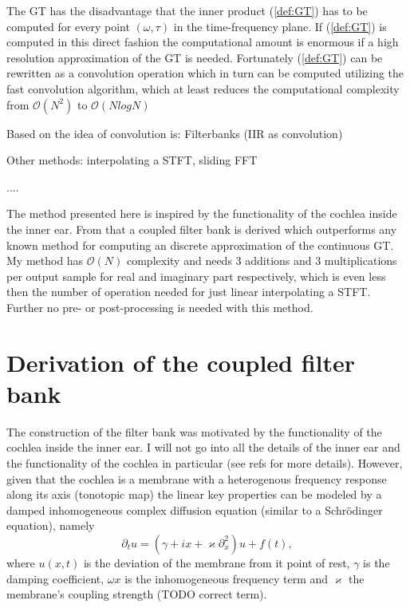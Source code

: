 \documentclass[journal]{IEEEtran}
\newcommand	{\be}	{\begin{equation}}
\newcommand	{\ee}	{\end{equation}}
\begin{document}
The GT has the disadvantage that the inner product (\ref{def:GT}) has to be computed for every
point $(\omega,\tau)$ in the time-frequency plane.
If (\ref{def:GT}) is computed in this direct fashion the computational amount is enormous
if a high resolution approximation of the GT is needed.
Fortunately (\ref{def:GT}) can be rewritten as a convolution operation which in turn can be
computed utilizing the fast convolution algorithm, which at least reduces the computational
complexity from ${\mathcal O}(N^2)$ to ${\mathcal O}(N log N )$

Based on the idea of convolution is: Filterbanks (IIR as convolution) \cite{Unser1994}

Other methods: interpolating a STFT, sliding FFT

....

The method presented here is inspired by the functionality of the cochlea inside the inner ear.
From that a coupled filter bank is derived which outperforms any known method for computing
an discrete approximation of the continuous GT. My method has ${\mathcal O}(N)$ complexity
and needs 3 additions and 3 multiplications per output sample for real and imaginary part respectively,
which is even less then the number of operation needed for just linear interpolating a STFT.
Further no pre- or post-processing is needed with this method.






  \section{Derivation of the coupled filter bank}
  \label{sec:construction}

The construction of the filter bank was motivated by the functionality of the cochlea inside the inner ear.
I will not go into all the details of the inner ear and the functionality of the cochlea in particular (see
refs for more details). However, given that the cochlea is a membrane with a heterogenous frequency response
along its axis (tonotopic map) the linear key properties can be modeled by a damped inhomogeneous complex diffusion equation (similar to a Schr\"odinger equation), namely
\be \label{pde}
	\partial_t u = (\gamma + i x + \varkappa \partial_x^2 ) u  +  f(t),
\ee
where $u(x,t)$ is the deviation of the membrane from it point of rest, $\gamma$ is the damping coefficient,
$\omega x$ is the inhomogeneous frequency term and $\varkappa$ the membrane's coupling strength (TODO correct term).
\end{document}
